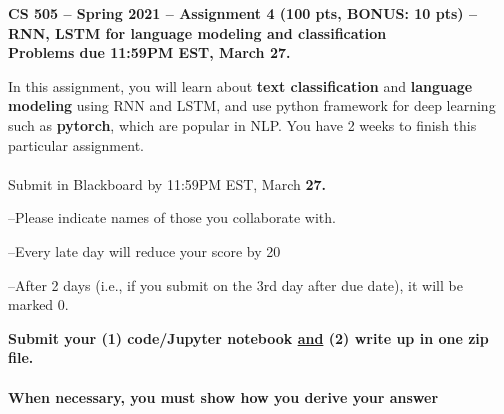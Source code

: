 \documentclass{article}
\begin{document}
        
\begin{center}
{\textbf{CS 505 -- Spring 2021 -- Assignment 4 (100 pts, BONUS: 10 pts) --
RNN, LSTM for language modeling and classification}}\\
\large{\textbf{Problems due 11:59PM EST, March 27.}  }
\end{center}

\noindent In this assignment, you will learn about \textbf{text classification}
and \textbf{language modeling} using RNN and LSTM, and use python framework for deep learning such as \textbf{pytorch}, which are popular in NLP. You have 2 weeks to finish
this particular assignment.

\paragraph{}

Submit in Blackboard by 11:59PM EST, March\textbf{ 27. }

--Please indicate names of those you collaborate with. 

--Every late day will reduce your score by 20%

--After 2 days (i.e., if you submit on the 3rd day after due date), it will
be marked 0. 

\begin{center}

\textbf{Submit your (1) code/Jupyter notebook \uline{and} (2) write up in one zip file.}

\paragraph{}
\textbf{When necessary, you must show how you derive your
answer} 
\end{center}
\end{document}
